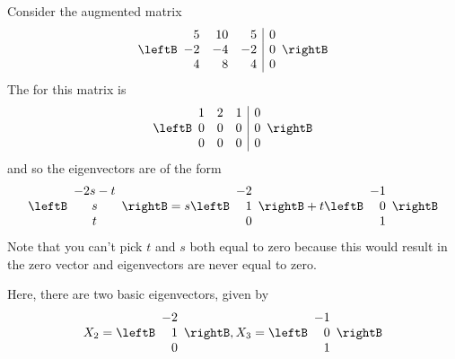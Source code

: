\begin{solution}
Consider the augmented matrix 
\begin{equation*}
\leftB
\begin{array}{rrr|r}
5 & 10 & 5 & 0 \\
 -2 &  -4  &  -2 & 0 \\
4 & 8  & 4 & 0
\end{array}
\rightB
\end{equation*}
The \rref \;for this matrix is
\begin{equation*}
\leftB
\begin{array}{rrr|r}
1 & 2 & 1 & 0 \\
0 & 0 & 0 & 0 \\
0 & 0 & 0 & 0
\end{array}
\rightB
\end{equation*}
and so the eigenvectors are of the form
\begin{equation*}
\leftB
\begin{array}{c}
-2s-t \\
s \\
t
\end{array}
\rightB =s\leftB
\begin{array}{r}
-2 \\
1 \\
0
\end{array}
\rightB +t\leftB
\begin{array}{r}
-1 \\
0 \\
1
\end{array}
\rightB 
\end{equation*}
Note that you can't pick $t$ and $s$ both equal to zero because this would result in
the zero vector and eigenvectors are never equal to zero. 

Here, there are two basic eigenvectors, given by 
\begin{equation*}
X_2
=
\leftB
\begin{array}{r}
-2 \\
1\\
0
\end{array}
\rightB ,
X_3
=
\leftB
\begin{array}{r}
-1 \\
0 \\
1
\end{array}
\rightB
\end{equation*}


\end{solution}
